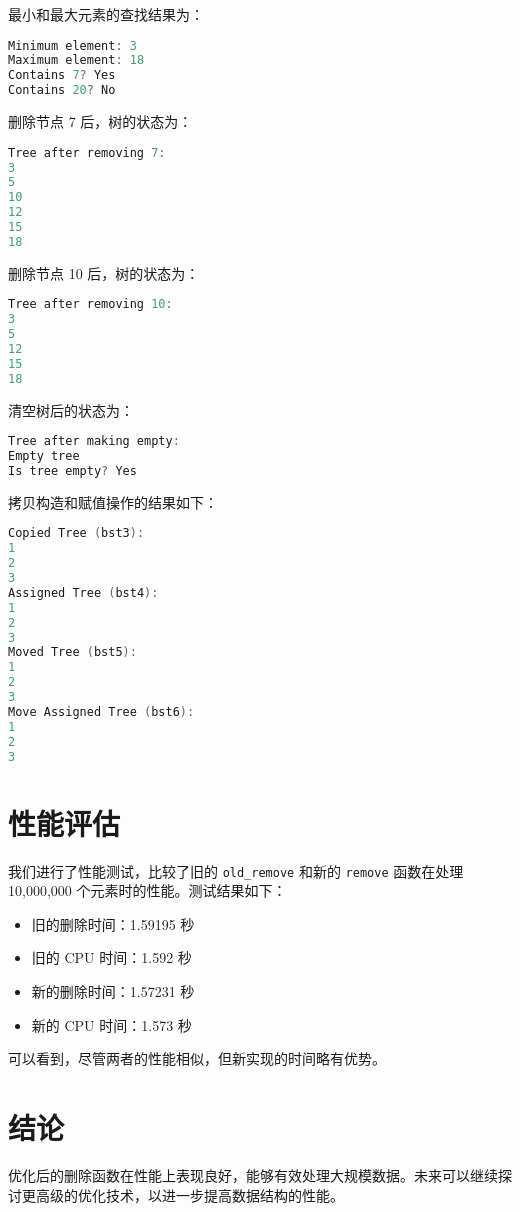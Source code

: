 \documentclass{article}
\begin{document}
最小和最大元素的查找结果为：

\begin{lstlisting}[language=C++]
Minimum element: 3
Maximum element: 18
Contains 7? Yes
Contains 20? No
\end{lstlisting}

删除节点 7 后，树的状态为：

\begin{lstlisting}[language=C++]
Tree after removing 7:
3
5
10
12
15
18
\end{lstlisting}

删除节点 10 后，树的状态为：

\begin{lstlisting}[language=C++]
Tree after removing 10:
3
5
12
15
18
\end{lstlisting}

清空树后的状态为：

\begin{lstlisting}[language=C++]
Tree after making empty:
Empty tree
Is tree empty? Yes
\end{lstlisting}

拷贝构造和赋值操作的结果如下：

\begin{lstlisting}[language=C++]
Copied Tree (bst3):
1
2
3
Assigned Tree (bst4):
1
2
3
Moved Tree (bst5):
1
2
3
Move Assigned Tree (bst6):
1
2
3
\end{lstlisting}

\section{性能评估}
我们进行了性能测试，比较了旧的 \texttt{old\_remove} 和新的 \texttt{remove} 函数在处理 10,000,000 个元素时的性能。测试结果如下：

\begin{itemize}
    \item 旧的删除时间：1.59195 秒
    \item 旧的 CPU 时间：1.592 秒
    \item 新的删除时间：1.57231 秒
    \item 新的 CPU 时间：1.573 秒
\end{itemize}

可以看到，尽管两者的性能相似，但新实现的时间略有优势。

\section{结论}
优化后的删除函数在性能上表现良好，能够有效处理大规模数据。未来可以继续探讨更高级的优化技术，以进一步提高数据结构的性能。
\end{document}
